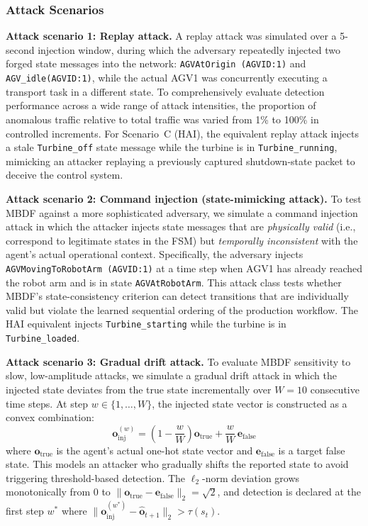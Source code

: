 \documentclass[manuscript,screen,review]{acmart}
\begin{document}
\subsubsection{Attack Scenarios}
\label{sec:attack_scenarios}

\textbf{Attack scenario 1: Replay attack.}
A replay attack was simulated over a 5-second injection
window, during which the adversary repeatedly injected two
forged state messages into the network:
\texttt{AGVAtOrigin~(AGVID:1)} and
\texttt{AGV\_idle(AGVID:1)}, while the actual AGV1 was
concurrently executing a transport task in a different
state. To comprehensively evaluate detection performance
across a wide range of attack intensities, the proportion
of anomalous traffic relative to total traffic was varied
from 1\% to 100\% in controlled increments. For
Scenario~C (HAI), the equivalent replay attack injects a
stale \texttt{Turbine\_off} state message while the
turbine is in \texttt{Turbine\_running}, mimicking an
attacker replaying a previously captured shutdown-state
packet to deceive the control system.

\textbf{Attack scenario 2: Command injection
(state-mimicking attack).}
To test MBDF against a more sophisticated adversary, we
simulate a command injection attack in which the attacker
injects state messages that are \emph{physically valid}
(i.e., correspond to legitimate states in the FSM) but
\emph{temporally inconsistent} with the agent's actual
operational context. Specifically, the adversary injects
\texttt{AGVMovingToRobotArm~(AGVID:1)} at a time step
when AGV1 has already reached the robot arm and is in
state \texttt{AGVAtRobotArm}. This attack class tests
whether MBDF's state-consistency criterion can detect
transitions that are individually valid but violate the
learned sequential ordering of the production workflow.
The HAI equivalent injects \texttt{Turbine\_starting}
while the turbine is in \texttt{Turbine\_loaded}.

\textbf{Attack scenario 3: Gradual drift attack.}
To evaluate MBDF sensitivity to slow, low-amplitude
attacks, we simulate a gradual drift attack in which
the injected state deviates from the true state
incrementally over $W = 10$ consecutive time steps.
At step $w \in \{1,\ldots,W\}$, the injected state
vector is constructed as a convex combination:
\begin{equation}
\mathbf{o}^{(w)}_{\mathrm{inj}} =
\left(1 - \frac{w}{W}\right)\mathbf{o}_{\mathrm{true}}
+ \frac{w}{W}\,\mathbf{e}_{\mathrm{false}}
\label{eq:drift}
\end{equation}
where $\mathbf{o}_{\mathrm{true}}$ is the agent's actual
one-hot state vector and $\mathbf{e}_{\mathrm{false}}$
is a target false state. This models an attacker who
gradually shifts the reported state to avoid triggering
threshold-based detection. The $\ell_2$-norm deviation
grows monotonically from 0 to
$\|\mathbf{o}_{\mathrm{true}} -
  \mathbf{e}_{\mathrm{false}}\|_2 = \sqrt{2}$,
and detection is declared at the first step $w^*$ where
$\|\mathbf{o}^{(w^*)}_{\mathrm{inj}} -
  \hat{\mathbf{o}}_{t+1}\|_2 > \tau(s_t)$.
\end{document}
